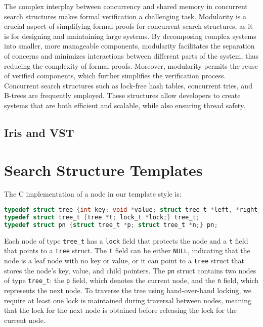 \documentclass[a4paper,UKenglish,cleveref, autoref, thm-restate]{lipics-v2021}
\begin{document}
The complex interplay between concurrency and shared memory in concurrent search structures makes formal verification a challenging task. Modularity is a crucial aspect of simplifying formal proofs for concurrent search structures, as it is for designing and maintaining large systems. By decomposing complex systems into smaller, more manageable components, modularity facilitates the separation of concerns and minimizes interactions between different parts of the system, thus reducing the complexity of formal proofs. Moreover, modularity permits the reuse of verified components, which further simplifies the verification process. Concurrent search structures such as lock-free hash tables, concurrent tries, and B-trees are frequently employed. These structures allow developers to create systems that are both efficient and scalable, while also ensuring thread safety.

{\color{red}{(Say something to connect to template algorithms)}}


\subsection{Iris and VST}


\section{Search Structure Templates}
The C implementation of a node in our template style is:
\begin{lstlisting}[language = C, backgroundcolor=\color{white},   
	commentstyle=\color{codegreen},
	basicstyle=\ttfamily\footnotesize,
	breakatwhitespace=false,  breaklines=true,  keepspaces=true,                                
	showspaces=false,  showstringspaces=false,
	showtabs=false, tabsize=1]
typedef struct tree {int key; void *value; struct tree_t *left, *right;} tree;
typedef struct tree_t {tree *t; lock_t *lock;} tree_t;
typedef struct pn {struct tree_t *p; struct tree_t *n;} pn;
\end{lstlisting}
Each node of type \lstinline{tree_t} has a \lstinline{lock} field that protects the node and a \lstinline{t} field that points to a \lstinline{tree} struct. The \lstinline{t} field can be either \lstinline{NULL}, indicating that the node is a leaf node with no key or value, or it can point to a \lstinline{tree} struct that stores the node's key, value, and child pointers. The \lstinline{pn} struct contains two nodes of type \lstinline{tree_t}: the \lstinline{p}  field, which denotes the current node, and the \lstinline{n} field, which represents the next node. To traverse the tree using hand-over-hand locking, we require at least one lock is maintained during traversal between nodes, meaning that the lock for the next node is obtained before releasing the lock for the current node.
\end{document}
